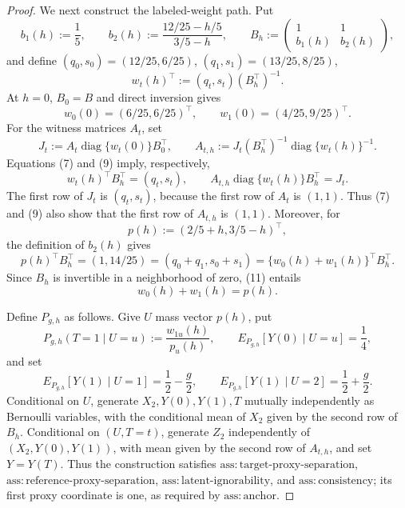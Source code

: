 \documentclass{article}
\begin{document}
\begin{proof}
We next construct the labeled-weight path.  Put
\[
 b_1(h):=\frac15,
 \qquad
 b_2(h):=\frac{12/25-h/5}{3/5-h},
 \qquad
 B_h:=\begin{pmatrix}1&1\\ b_1(h)&b_2(h)\end{pmatrix},                            \tag{6}
\]
and define \((q_0,s_0)=(12/25,6/25)\), \((q_1,s_1)=(13/25,8/25)\),
\[
 w_t(h)^\top:=(q_t,s_t)(B_h^\top)^{-1}.                                           \tag{7}
\]
At \(h=0\), \(B_0=B\) and direct inversion gives
\[
 w_0(0)=(6/25,6/25)^\top,
 \qquad
 w_1(0)=(4/25,9/25)^\top.                                                         \tag{8}
\]
For the witness matrices \(A_t\), set
\[
 J_t:=A_t\operatorname{diag}\{w_t(0)\}B_0^\top,
 \qquad
 A_{t,h}:=J_t(B_h^\top)^{-1}\operatorname{diag}\{w_t(h)\}^{-1}.                  \tag{9}
\]
Equations (7) and (9) imply, respectively,
\[
 w_t(h)^\top B_h^\top=(q_t,s_t),
 \qquad
 A_{t,h}\operatorname{diag}\{w_t(h)\}B_h^\top=J_t.                              \tag{10}
\]
The first row of \(J_t\) is \((q_t,s_t)\), because the first row of \(A_t\) is \((1,1)\).  Thus (7) and (9) also show that the first row of \(A_{t,h}\) is \((1,1)\).  Moreover, for
\[
 p(h):=(2/5+h,3/5-h)^\top,
\]
the definition of \(b_2(h)\) gives
\[
 p(h)^\top B_h^\top=(1,14/25)
 =(q_0+q_1,s_0+s_1)
 =\{w_0(h)+w_1(h)\}^\top B_h^\top.                                               \tag{11}
\]
Since \(B_h\) is invertible in a neighborhood of zero, (11) entails
\[
 w_0(h)+w_1(h)=p(h).                                                               \tag{12}
\]

Define \(P_{g,h}\) as follows.  Give \(U\) mass vector \(p(h)\), put
\[
 P_{g,h}(T=1\mid U=u):=\frac{w_{1u}(h)}{p_u(h)},
 \qquad
 E_{P_{g,h}}[Y(0)\mid U=u]=\frac14,                                                \tag{13}
\]
and set
\[
 E_{P_{g,h}}[Y(1)\mid U=1]=\frac12-\frac g2,
 \qquad
 E_{P_{g,h}}[Y(1)\mid U=2]=\frac12+\frac g2.                                     \tag{14}
\]
Conditional on \(U\), generate \(X_2,Y(0),Y(1),T\) mutually independently as Bernoulli variables, with the conditional mean of \(X_2\) given by the second row of \(B_h\).  Conditional on \((U,T=t)\), generate \(Z_2\) independently of \((X_2,Y(0),Y(1))\), with mean given by the second row of \(A_{t,h}\), and set \(Y=Y(T)\).  Thus the construction satisfies \(\mathrm{ass:target\text{-}proxy\text{-}separation}\), \(\mathrm{ass:reference\text{-}proxy\text{-}separation}\), \(\mathrm{ass:latent\text{-}ignorability}\), and \(\mathrm{ass:consistency}\); its first proxy coordinate is one, as required by \(\mathrm{ass:anchor}\).


\end{proof}
\end{document}
